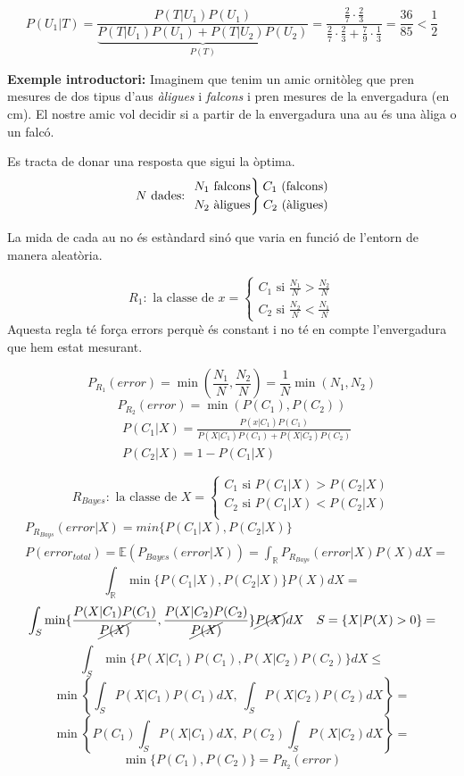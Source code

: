 \documentclass[a4paper]{article}
\begin{document}
$$
P(U_1|T) =  \frac{P(T|U_1) P(U_1)}{\underbrace{P(T|U_1)P(U_1) + P(T|U_2)P(U_2)}_{P(T)}} =
\frac{\frac{2}{7} · \frac{2}{3}}{\frac{2}{7}·\frac{2}{3} + \frac{7}{9}·\frac{1}{3}} =
\frac{36}{85} < \frac{1}{2}
$$

\textbf{Exemple introductori:} Imaginem que tenim un amic ornitòleg que pren mesures de dos tipus d'aus \emph{àligues} i \emph{falcons} i pren mesures de la envergadura (en cm). El nostre amic vol decidir si a partir de la envergadura una au és una àliga o un falcó. 

Es tracta de donar una resposta que sigui la òptima. 
$$
N \text{ dades: }
\begin{rcases*}
N_1 \text{ falcons} \\
N_2 \text{ àligues}
\end{rcases*}
\begin{aligned}
C_1 \text{ (falcons)} \\
C_2 \text{ (àligues)}
\end{aligned}
$$

La mida de cada au no és estàndard sinó que varia en funció de l'entorn de manera aleatòria. 

$$
R_1: \text{ la classe de } x = 
\begin{cases}
C_1 \text{ si } \frac{N_1}{N} > \frac{N_2}{N} \\
C_2 \text{ si } \frac{N_2}{N} < \frac{N_1}{N}
\end{cases}
$$ 
Aquesta regla té força errors perquè és constant i no té en compte l'envergadura que hem estat mesurant.

$$
P_{R_1} (error) = \min\left(\frac{N_1}{N}, \frac{N_2}{N}\right) = \frac{1}{N} \min(N_1, N_2)
$$
$$
P_{R_2} (error) = \min(P(C_1), P(C_2))
$$
\begin{align*}
	& P(C_1 | X) = \frac{P(x|C_1)P(C_1)}{P(X|C_1)P(C_1) + P(X|C_2)P(C_2)} \\
	& P(C_2|X) = 1 - P(C_1|X)
\end{align*}

$$
R_{Bayes}: \text{ la classe de } X =
\begin{cases}
C_1 \text{ si } P(C_1|X) > P(C_2|X) \\
C_2 \text{ si } P(C_1|X) < P(C_2|X) \\
\end{cases}
$$
\begin{align*}
&P_{R_{Bays}} (error|X) = min\{P(C_1|X), P(C_2|X)\} \\
&P(error_{total}) = \mathbb{E}(P_{Bayes} (error|X)) = 
\int_{\mathbb{R}} P_{R_{Bays}} (error|X)P(X)dX =
\end{align*}
$$
\int_{\mathbb{R}} \min\{P(C_1|X),P(C_2|X)\}P(X)dX =
$$
$$
\int_{S} \min\{\frac{P(X|C_1)P(C_1)}{\cancel{P(X)}}, \frac{P(X|C_2)P(C_2)}{\cancel{P(X)}}\}\cancel{P(X)} dX \quad S = \{X|P(X) > 0\} =
$$
$$
\int_S \min\{ P(X|C_1)P(C_1), P(X|C_2)P(C_2) \} dX \le
$$
$$
\min\left\{ \int_S P(X|C_1)P(C_1) dX,\ \int_S P(X|C_2)P(C_2)dX \right\} =
$$
$$
\min\left\{ P(C_1)\int_S P(X|C_1)dX,\ P(C_2)\int_S P(X|C_2)dX \right\} =
$$
$$
\min \{ P(C_1), P(C_2) \} = P_{R_2} (error)
$$
\end{document}

